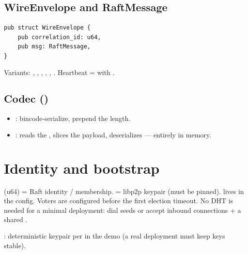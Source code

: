 \subsection{WireEnvelope and RaftMessage}

\begin{lstlisting}
pub struct WireEnvelope {
    pub correlation_id: u64,
    pub msg: RaftMessage,
}
\end{lstlisting}

{\raggedright
Variants: , , , , , . Heartbeat =  with .\par}

\subsection{Codec ()}

\begin{itemize}[nosep]
  \item {}: bincode-serialize, prepend the length.
  \item {}:  reads the , slices the payload, deserializes --- entirely in memory.
\end{itemize}

\section{Identity and bootstrap}

 (u64) = Raft identity / membership.  = libp2p keypair (must be pinned).  lives in the config. Voters are configured before the first election timeout. No DHT is needed for a minimal deployment: dial seeds or accept inbound connections + a shared .

: deterministic keypair per  in the demo (a real deployment must keep keys stable).
